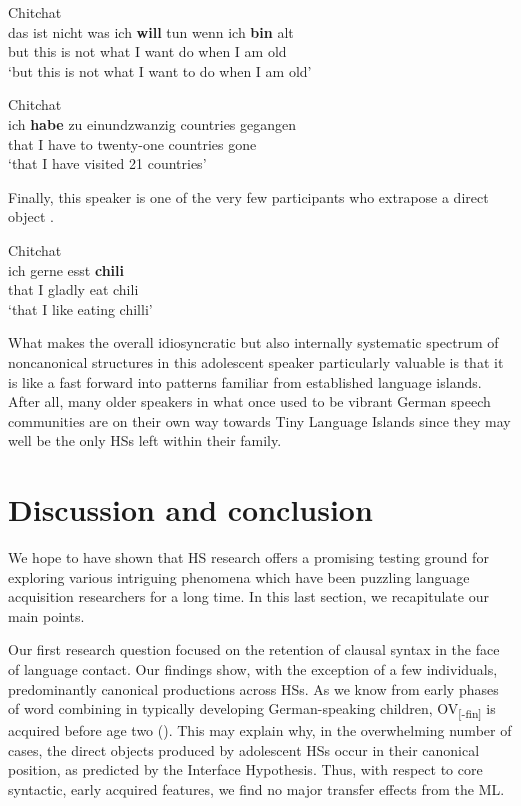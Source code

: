 \documentclass[output=paper]{langscibook}
\begin{document}
\ea%
\label{ex:tsehaye:14}
\ea \label{ex:tsehaye:14a} Chitchat\\
 {das} {ist} {nicht} {was} {ich} \textbf{{will}} {tun} {wenn} {ich} \textbf{{bin}} {alt}\\
but this is not what I want do when I am old\\
\glt ‘but this is not what I want to do when I am old’

\ex \label{ex:tsehaye:14b} Chitchat\\
 {ich} \textbf{{habe}} {zu} {einundzwanzig} {countries} {gegangen}\\
that I have to twenty-one countries gone\\
\glt ‘that I have visited 21 countries’
\z
\z

Finally, this speaker is one of the very few participants who extrapose a direct object .

\ea%
\label{ex:tsehaye:15}
Chitchat\\
 {ich} {gerne} {esst} \textbf{{chili}}\\
that I gladly eat chili\\
\glt ‘that I like eating chilli’
\z

What makes the overall idiosyncratic but also internally systematic spectrum of noncanonical structures in this adolescent speaker particularly valuable is that it is like a fast forward into patterns familiar from established language islands. After all, many older speakers in what once used to be vibrant German speech communities are on their own way towards Tiny Language Islands since they may well be the only HSs left within their family.

\section{Discussion and conclusion}\label{sec:tsehaye:7}

We hope to have shown that HS research offers a promising testing ground for exploring various intriguing phenomena which have been puzzling language acquisition researchers for a long time. In this last section, we recapitulate our main points. 

Our first research question focused on the retention of clausal syntax in the face of language contact. Our findings show, with the exception of a few individuals, predominantly canonical productions across HSs. As we know from early phases of word combining in typically developing German-speaking children, OV\textsubscript{[-fin]} is acquired before age two (\citealt{SchulzTracy2018}). This may explain why, in the overwhelming number of cases, the direct objects produced by adolescent HSs occur in their canonical position, as predicted by the Interface Hypothesis. Thus, with respect to core syntactic, early acquired features, we find no major transfer effects from the ML.
\end{document}
